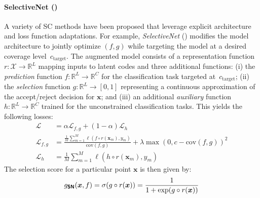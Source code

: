 \paragraph{SelectiveNet (\sn)} 
A variety of SC methods have been proposed that leverage explicit architecture and loss function adaptations. For example, \emph{SelectiveNet} (\sn) \citep{geifman2019selectivenet} modifies the model architecture to jointly optimize $(f,g)$ while targeting the model at a desired coverage level~$c_\text{target}$. The augmented model consists of a representation function $r: \mathcal{X} \rightarrow \mathbb{R}^L$ mapping inputs to latent codes and three additional functions: (i) the \emph{prediction} function $f: \mathbb{R}^L \rightarrow \mathbb{R}^C$ for the classification task targeted at~$c_\text{target}$; (ii) the \emph{selection} function $g: \mathbb{R}^L \rightarrow [0,1]$ representing a continuous approximation of the accept/reject decision for $\bm{x}$; and (iii) an additional \emph{auxiliary} function $h: \mathbb{R}^L \rightarrow \mathbb{R}^C$ trained for the unconstrained classification tasks. This yields the following losses:
 \begin{align}
 	\mathcal{L} & = \alpha \mathcal{L}_{f,g} + (1-\alpha) \mathcal{L}_h \\
 	\mathcal{L}_{f,g} & = \frac{\frac{1}{M}\sum_{m=1}^{M} \ell( f \circ r(\bm{x}_m) , y_m)}{\text{cov}(f,g)} + \lambda \max(0, c - \text{cov}(f,g))^2 \\
 	\mathcal{L}_{h} & = \frac{1}{M}\sum_{m=1}^{M} \ell( h \circ r(\bm{x}_m) , y_m)
 \end{align}
 The selection score for a particular point $\bm{x}$ is then given by:
 \begin{equation}
 	g_{\textbf{\sffamily SN}}(\bm{x}, f) = \sigma(g \circ r(\bm{x})) = \frac{1}{1 + \exp(g \circ r(\bm{x}))}
 \end{equation}

